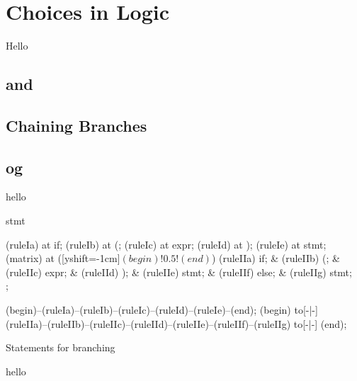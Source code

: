 \section{Choices in Logic}
\label{sec:flow:branch}

Hello

\subsection{ and }
\subsection{}
\subsection{Chaining Branches}
\subsection{ og }

\csharpsubsection{\csharp}
hello

\begin{syntaxfloat}
  \begin{syntax}{stmt}
    
    \node[terminal]    (ruleIa)  at  {if};
    \node[terminal]    (ruleIb)  at  {(};
    \node[nonterminal] (ruleIc)  at  {expr};
    \node[terminal]    (ruleId)  at  {)};
    \node[nonterminal] (ruleIe)  at  {stmt};
    \node[sequence] (matrix) at ([yshift=-1cm]$(begin)!0.5!(end)$) {
      \node[terminal]    (ruleIIa) {if};
      &
      \node[terminal]    (ruleIIb) {(};
      &
      \node[nonterminal] (ruleIIc) {expr};
      &
      \node[terminal]    (ruleIId) {)};
      &
      \node[nonterminal] (ruleIIe) {stmt};
      &
      \node[terminal]    (ruleIIf) {else};
      &
      \node[nonterminal] (ruleIIg) {stmt};
      \\
    };
    
    \draw[path] (begin)--(ruleIa)--(ruleIb)--(ruleIc)--(ruleId)--(ruleIe)--(end);
    \draw[path] (begin) to[-|-] (ruleIIa)--(ruleIIb)--(ruleIIc)--(ruleIId)--(ruleIIe)--(ruleIIf)--(ruleIIg) to[-|-] (end);
  \end{syntax}
  \caption{Statements for branching}
\end{syntaxfloat}

hello
